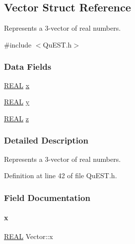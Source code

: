 \hypertarget{structVector}{}\subsection{Vector Struct Reference}
\label{structVector}


Represents a 3-\/vector of real numbers.  




{\ttfamily \#include $<$Qu\+E\+S\+T.\+h$>$}

\subsubsection*{Data Fields}
\begin{DoxyCompactItemize}
\item 
\mbox{\hyperlink{QuEST__precision_8h_a4b654506f18b8bfd61ad2a29a7e38c25}{R\+E\+AL}} \mbox{\hyperlink{structVector_aac7abe171ba4bada50ed72acba6259fc}{x}}
\item 
\mbox{\hyperlink{QuEST__precision_8h_a4b654506f18b8bfd61ad2a29a7e38c25}{R\+E\+AL}} \mbox{\hyperlink{structVector_a375ca805d4c808a53d7c4e0c737ae3de}{y}}
\item 
\mbox{\hyperlink{QuEST__precision_8h_a4b654506f18b8bfd61ad2a29a7e38c25}{R\+E\+AL}} \mbox{\hyperlink{structVector_ad4e863651be7d6b7e2b28cd7445a0ccf}{z}}
\end{DoxyCompactItemize}


\subsubsection{Detailed Description}
Represents a 3-\/vector of real numbers. 

Definition at line 42 of file Qu\+E\+S\+T.\+h.



\subsubsection{Field Documentation}
\mbox{\label{structVector_aac7abe171ba4bada50ed72acba6259fc}} 
\paragraph{\texorpdfstring{x}{x}}
{\footnotesize\ttfamily \mbox{\hyperlink{QuEST__precision_8h_a4b654506f18b8bfd61ad2a29a7e38c25}{R\+E\+AL}} Vector\+::x}



